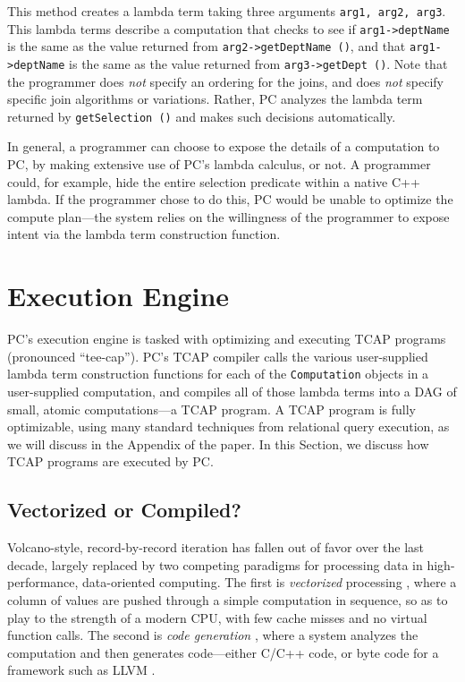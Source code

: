 \noindent
This method creates a lambda term taking three arguments \texttt{arg1, arg2, arg3}.  This lambda terms describe a computation that
checks to see if \texttt{arg1->deptName} is the same as the value
returned from \texttt{arg2->getDeptName ()}, and
that \texttt{arg1->deptName} is the same as the value returned from \texttt{arg3}\-\texttt{->getDept ()}. 
Note that the programmer does \emph{not} specify an ordering for the joins, and does \emph{not} specify specific join algorithms or variations.  Rather, PC
analyzes the lambda term returned by \texttt{getSelection ()} and
makes such decisions automatically.

In general, a programmer can choose to expose the details of a computation to PC, by making extensive use of PC's lambda
calculus, or not.  A programmer could, for example, hide the entire selection predicate within a native C++ lambda.
If the programmer chose to do this, PC would be unable to optimize the compute plan---the system relies on the willingness of the 
programmer to expose intent via the lambda term construction function.

\section{Execution Engine}
\label{sec:engine}

PC's execution engine is tasked with optimizing and executing TCAP programs (pronounced ``tee-cap'').  
PC's TCAP compiler
calls the various user-supplied lambda term construction functions for each of the \texttt{Computation} objects in a
user-supplied computation,
and compiles all of those lambda terms into a DAG of small, atomic computations---a TCAP program.
A TCAP program is fully optimizable, using many standard techniques from relational query execution, as we
will discuss in the Appendix of the paper.
In this Section, we discuss how TCAP programs are executed by PC.

\subsection{Vectorized or Compiled?}
Volcano-style, record-by-record iteration \cite{graefe1990encapsulation} has fallen out of favor over the last decade, largely replaced by
two competing paradigms for processing data
in high-performance, data-oriented computing.  The first is \emph{vectorized} processing \cite{abadi2009column, boncz2005monetdb, zukowski2005monetdb, idreos2012monetdb}, where a column of values are pushed
through a simple computation in sequence, so as to play to the strength of a modern CPU, with few cache misses and no virtual
function calls.  The second is \emph{code generation} \cite{neumann2011efficiently, nagel2014code, bress2017generating, klonatos2014building, ahmad2009dbtoaster}, where a system analyzes the computation
and then generates code---either C/C++ code, or byte code for a framework such as LLVM \cite{lattner2004llvm, lattner2002llvm}.

